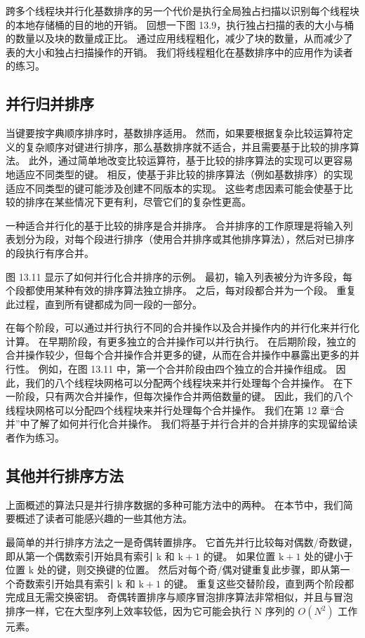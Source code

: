 跨多个线程块并行化基数排序的另一个代价是执行全局独占扫描以识别每个线程块的本地存储桶的目的地的开销。 回想一下图 13.9，执行独占扫描的表的大小与桶的数量以及块的数量成正比。 通过应用线程粗化，减少了块的数量，从而减少了表的大小和独占扫描操作的开销。 我们将线程粗化在基数排序中的应用作为读者的练习。

\subsection{并行归并排序}
当键要按字典顺序排序时，基数排序适用。 然而，如果要根据复杂比较运算符定义的复杂顺序对键进行排序，那么基数排序就不适合，并且需要基于比较的排序算法。 此外，通过简单地改变比较运算符，基于比较的排序算法的实现可以更容易地适应不同类型的键。 相反，使基于非比较的排序算法（例如基数排序）的实现适应不同类型的键可能涉及创建不同版本的实现。 这些考虑因素可能会使基于比较的排序在某些情况下更有利，尽管它们的复杂性更高。

一种适合并行化的基于比较的排序是合并排序。 合并排序的工作原理是将输入列表划分为段，对每个段进行排序（使用合并排序或其他排序算法），然后对已排序的段执行有序合并。

图 13.11 显示了如何并行化合并排序的示例。 最初，输入列表被分为许多段，每个段都使用某种有效的排序算法独立排序。 之后，每对段都合并为一个段。 重复此过程，直到所有键都成为同一段的一部分。

在每个阶段，可以通过并行执行不同的合并操作以及合并操作内的并行化来并行化计算。 在早期阶段，有更多独立的合并操作可以并行执行。 在后期阶段，独立的合并操作较少，但每个合并操作合并更多的键，从而在合并操作中暴露出更多的并行性。 例如，在图 13.11 中，第一个合并阶段由四个独立的合并操作组成。 因此，我们的八个线程块网格可以分配两个线程块来并行处理每个合并操作。 在下一阶段，只有两次合并操作，但每次操作合并两倍数量的键。 因此，我们的八个线程块网格可以分配四个线程块来并行处理每个合并操作。 我们在第 12 章“合并”中了解了如何并行化合并操作。 我们将基于并行合并的合并排序的实现留给读者作为练习。

\subsection{其他并行排序方法}
上面概述的算法只是并行排序数据的多种可能方法中的两种。 在本节中，我们简要概述了读者可能感兴趣的一些其他方法。

最简单的并行排序方法之一是奇偶转置排序。 它首先并行比较每对偶数/奇数键，即从第一个偶数索引开始具有索引 $\mathrm{k}$ 和 $\mathrm{k}+1$ 的键。 如果位置 $\mathrm{k}+1$ 处的键小于位置 $\mathrm{k}$ 处的键，则交换键的位置。 然后对每个奇/偶对键重复此步骤，即从第一个奇数索引开始具有索引 $\mathrm{k}$ 和 $\mathrm{k}+1$ 的键。 重复这些交替阶段，直到两个阶段都完成且无需交换密钥。 奇偶转置排序与顺序冒泡排序算法非常相似，并且与冒泡排序一样，它在大型序列上效率较低，因为它可能会执行 N 序列的 $O\left(N^{2}\right)$ 工作  元素。

